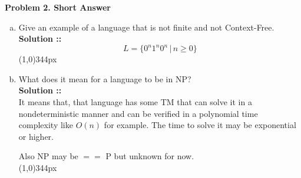 \documentclass[11pt]{article}
\begin{document}

\textbf{Problem 2. Short Answer}
\begin{enumerate}[a.]
\item
Give an example of a language that is not finite and not Context-Free. \\
\vspace{5px}\textbf{Solution ::}
$$L = \{0^n1^n0^n \,|\, n\ge 0\}$$
\line(1,0){344px}

\item 
What does it mean for a language to be in NP? \\
\vspace{5px}\textbf{Solution ::} \\
It means that, that language has some TM that can solve it in a \\nondeterministic
manner and can be verified in a polynomial time \\complexity like $O(n)$ for example.
The time to solve it may be exponential or higher.

Also NP may be $==$ P but unknown for now. \\
\line(1,0){344px}


\end{enumerate}
\end{document}
